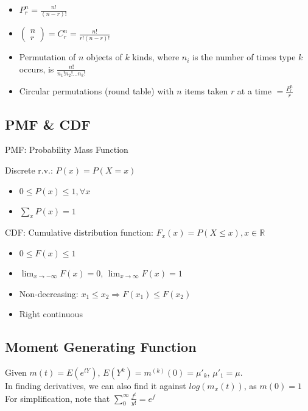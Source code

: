 \documentclass[12pt]{article}
\newcommand\mm[1]{\begin{pmatrix}#1\end{pmatrix}}
\newcommand{\real}[0]{\mathbb{R}}
\begin{document}
\begin{itemize}
	\item $P_r^n = \frac{n!}{(n - r)!}$
	\item $\mm{n \\ r} = C_r^n = \frac{n!}{r! (n - r)!}$
	\item Permutation of $n$ objects of $k$ kinds, where $n_i$ is the number of times type $k$ occurs, is $\frac{n!}{n_1! n_2! ... n_k!}$
	\item Circular permutations (round table) with $n$ items taken $r$ at a time $ = \frac{P_r^n}{r}$
\end{itemize}

\subsection{PMF \& CDF}

PMF: Probability Mass Function

Discrete r.v.: $P(x) = P(X = x)$

\begin{itemize}
	\item $0 \le P(x) \le 1, \forall x$
	\item $\sum_x P(x) = 1$
\end{itemize}

CDF: Cumulative distribution function: $F_x(x) = P(X \le x), x \in \real$

\begin{itemize}
	\item $0 \le F(x) \le 1$
	\item $\lim_{x \rightarrow -\infty} F(x) = 0$, $\lim_{x \rightarrow \infty} F(x) = 1$
	\item Non-decreasing: $x_1 \le x_2 \Rightarrow F(x_1) \le F(x_2)$
	\item Right continuous
\end{itemize}

\subsection{Moment Generating Function}

Given $m(t) = E(e^{tY})$, $E(Y^k) = m^{(k)}(0) = \mu'_k$, $\mu'_1 = \mu$. \\
In finding derivatives, we can also find it against $log(m_x(t))$, as $m(0) = 1$ \\

For simplification, note that $\sum_0^\infty \frac{f^t}{y!} = e^f$
\end{document}
